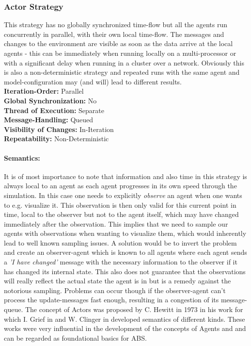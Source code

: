 \subsubsection{Actor Strategy}
This strategy has no globally synchronized time-flow but all the agents run concurrently in parallel, with their own local time-flow. The messages and changes to the environment are visible as soon as the data arrive at the local agents - this can be immediately when running locally on a multi-processor or with a significant delay when running in a cluster over a network. Obviously this is also a non-deterministic strategy and repeated runs with the same agent and model-configuration may (and will) lead to different results. \\

\textbf{Iteration-Order:} Parallel \\
\textbf{Global Synchronization:} No \\
\textbf{Thread of Execution:} Separate \\
\textbf{Message-Handling:} Queued \\
\textbf{Visibility of Changes:}	In-Iteration \\
\textbf{Repeatability:}	Non-Deterministic 

\paragraph{Semantics:} It is of most importance to note that information and also time in this strategy is always local to an agent as each agent progresses in its own speed through the simulation. In this case one needs to explicitly \textit{observe} an agent when one wants to e.g. visualize it. This observation is then only valid for this current point in time, local to the observer but not to the agent itself, which may have changed immediately after the observation. This implies that we need to sample our agents with observations when wanting to visualize them, which would inherently lead to well known sampling issues. A solution would be to invert the problem and create an observer-agent which is known to all agents where each agent sends a \textit{'I have changed'} message with the necessary information to the observer if it has changed its internal state. This also does not guarantee that the observations will really reflect the actual state the agent is in but is a remedy against the notorious sampling. Problems can occur though if the observer-agent can't process the update-messages fast enough, resulting in a congestion of its message-queue. 
The concept of Actors was proposed by C. Hewitt in 1973 in his work \cite{hewitt_universal_1973} for which I. Grief in \cite{grief_semantics_1975} and W. Clinger in \cite{clinger_foundations_1981} developed semantics of different kinds. These works were very influential in the development of the concepts of Agents and and can be regarded as foundational basics for ABS.

